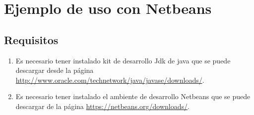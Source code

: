 \chapter{Ejemplo de uso con Netbeans}



	\section{Requisitos}

	\begin{enumerate}

		\item Es necesario tener instalado kit de desarrollo Jdk de java que se puede descargar desde la página \url{http://www.oracle.com/technetwork/java/javase/downloads/}.

		\item Es necesario tener instalado el ambiente de desarrollo Netbeans que se puede descargar de la página \url{https://netbeans.org/downloads/}.
	\end{enumerate}

